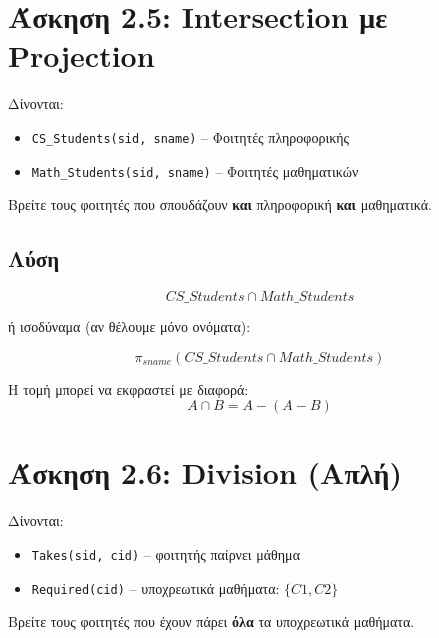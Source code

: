 \section{Άσκηση 2.5: Intersection με Projection}

\begin{formulabox}[Εκφώνηση]
Δίνονται:
\begin{itemize}
    \item \texttt{CS\_Students(sid, sname)} -- Φοιτητές πληροφορικής
    \item \texttt{Math\_Students(sid, sname)} -- Φοιτητές μαθηματικών
\end{itemize}

Βρείτε τους φοιτητές που σπουδάζουν \textbf{και} πληροφορική \textbf{και} μαθηματικά.
\end{formulabox}

\subsection*{Λύση}

$$CS\_Students \cap Math\_Students$$

ή ισοδύναμα (αν θέλουμε μόνο ονόματα):

$$\pi_{sname}(CS\_Students \cap Math\_Students)$$

\begin{infobox}[Ισοδυναμία]
Η τομή μπορεί να εκφραστεί με διαφορά:
$$A \cap B = A - (A - B)$$
\end{infobox}

\section{Άσκηση 2.6: Division (Απλή)}

\begin{formulabox}[Εκφώνηση]
Δίνονται:
\begin{itemize}
    \item \texttt{Takes(sid, cid)} -- φοιτητής παίρνει μάθημα
    \item \texttt{Required(cid)} -- υποχρεωτικά μαθήματα: $\{C1, C2\}$
\end{itemize}

Βρείτε τους φοιτητές που έχουν πάρει \textbf{όλα} τα υποχρεωτικά μαθήματα.
\end{formulabox}

